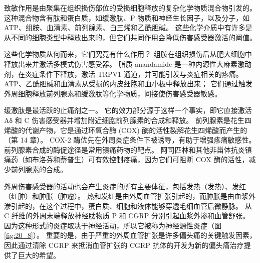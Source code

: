 致敏作用是由聚集在组织损伤部位的受损细胞释放的复杂化学物质混合物引发的。 
这种混合物含有肽和蛋白质，如缓激肽、P 物质和神经生长因子，以及分子，如 ATP、组胺、血清素、前列腺素、白三烯和乙酰胆碱。 
这些化学介质中有许多是从不同的细胞类型中释放出来的，但它们共同作用会降低伤害感受器激活的阈值。


这些化学物质从何而来，它们究竟有什么作用？ 
组胺在组织损伤后从肥大细胞中释放出来并激活多模式伤害感受器。 
脂质 anandamide 是一种内源性大麻素激动剂，在炎症条件下释放，激活 TRPV1 通道，并可能引发与炎症相关的疼痛。 
ATP、乙酰胆碱和血清素从受损的内皮细胞和血小板中释放出来； 它们通过触发外周细胞释放前列腺素和缓激肽等化学物质，间接使伤害感受器敏感。


缓激肽是最活跃的止痛剂之一。 
它的效力部分源于这样一个事实，即它直接激活 Aδ 和 C 伤害感受器并增加附近细胞前列腺素的合成和释放。 
前列腺素是花生四烯酸的代谢产物，它是通过环氧合酶 (COX) 酶的活性裂解花生四烯酸而产生的（第 14 章）。 
COX-2 酶优先在外周炎症条件下被诱导，有助于增强疼痛敏感性。 
前列腺素合成的酶促途径是常用镇痛药物的靶点。 
阿司匹林和其他非甾体抗炎镇痛药（如布洛芬和萘普生）可有效控制疼痛，因为它们可阻断 COX 酶的活性，减少前列腺素的合成。


外周伤害感受器的活动也会产生炎症的所有主要体征，包括发热（发热）、发红（红肿）和肿胀（肿瘤）。 
热和发红是由外周血管扩张引起的，而肿胀是由血浆外渗引起的，在这个过程中，蛋白质、细胞和液体能够穿透毛细血管后微静脉。 
从 C 纤维的外周末端释放神经肽物质 P 和 CGRP 分别引起血浆外渗和血管舒张。 
因为这种形式的炎症取决于神经活动，所以它被称为神经源性炎症（图 \ref{fig:20_8}）。 
重要的是，由于严重的外周血管扩张是许多偏头痛的关键触发因素，因此通过清除 CGRP 来抵消血管扩张的 CGRP 抗体的开发为新的偏头痛治疗提供了巨大的希望。

